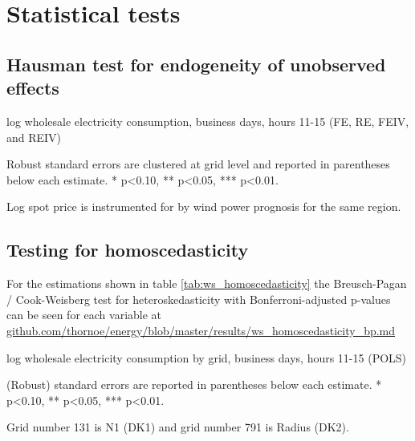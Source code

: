 \section{Statistical tests}
\label{app:statistical_tests}

\subsection{Hausman test for endogeneity of unobserved effects}
\label{app:hausman}
\begin{table}[H]
\centering
\begin{threeparttable}
  \caption{log wholesale electricity consumption, business days, hours 11-15 (FE, RE, FEIV, and REIV)}
  \label{tab:ws_fe}
  \footnotesize
    
    \begin{tablenotes}
    \item Robust standard errors are clustered at grid level and reported in parentheses below each estimate. * p<0.10, ** p<0.05, *** p<0.01.
    \item Log spot price is instrumented for by wind power prognosis for the same region.
  \end{tablenotes}
\end{threeparttable}
\end{table}

\clearpage

\subsection{Testing for homoscedasticity}
\label{app:homoscedasticity}
For the estimations shown in table \ref{tab:ws_homoscedasticity} the Breusch-Pagan / Cook-Weisberg test for heteroskedasticity with Bonferroni-adjusted p-values can be seen for each variable at \href{https://github.com/thornoe/energy/blob/master/results/ws_homoscedasticity_bp.md}{github.com/thornoe/energy/blob/master/results/ws\_homoscedasticity\_bp.md}
\begin{table}[H]
\centering
\begin{threeparttable}
  \caption{log wholesale electricity consumption by grid, business days, hours 11-15 (POLS)}
  \label{tab:ws_homoscedasticity}
  \footnotesize
    
    \begin{tablenotes}
    \item (Robust) standard errors are reported in parentheses below each estimate. * p<0.10, ** p<0.05, *** p<0.01.
    \item Grid number 131 is N1 (DK1) and grid number 791 is Radius (DK2).
  \end{tablenotes}
\end{threeparttable}
\end{table}

